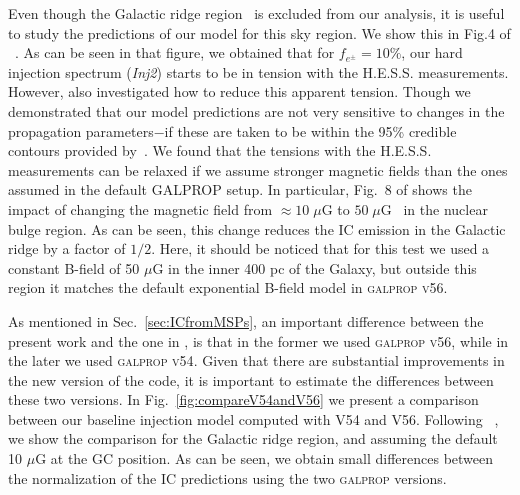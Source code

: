 \documentclass[doublespace,nopageskip]{VTthesis} %
\begin{document}
Even though the Galactic ridge region~\citep{2006Natur.439..695A} is excluded from our analysis, it is useful to study the predictions of our model for this sky region. We show this in Fig.4 of ~\citep{2019PhRvD..99l3020S}. As can be seen in that figure,
we obtained that for $f_{e^\pm} = 10\%$, our hard injection spectrum (\textit{Inj2}) starts to be in tension with the H.E.S.S. measurements. However, \citet{2019PhRvD..99l3020S} also investigated how to reduce this apparent tension. Though we demonstrated that our model predictions are not very sensitive to changes in the propagation parameters$-$if these are taken to be within the 95\% credible contours provided by~\citet{2016ApJ...824...16J}. We found that the tensions with the H.E.S.S. measurements can be relaxed if we assume stronger magnetic fields than the ones assumed in the default GALPROP setup. In particular, Fig.~8 of \citet{2019PhRvD..99l3020S} shows the impact of changing the magnetic field from  $\approx 10\; \mu$G to $50\;\mu$G~\citep{2010Natur.463...65C} in the nuclear bulge region. As can be seen, this change reduces the IC emission in the Galactic ridge by a factor of $1/2$.  Here, it should be noticed that for this test we used a constant B-field of 50 $\mu$G in the inner 400 pc of the Galaxy, but outside this region it matches the default exponential B-field model in \textsc{galprop v56}.  

As mentioned in Sec.~\ref{sec:ICfromMSPs}, an important difference between the present work and the one in \citep{2019PhRvD..99l3020S}, is that in the former we used \textsc{galprop v56}, while in the later we used \textsc{galprop v54}. Given that there are substantial improvements in the new version of the code, it is important to estimate the differences between these two versions. In Fig.~\ref{fig:compareV54andV56} we present a comparison between our baseline injection model computed with V54 and V56. Following ~\citep{2019PhRvD..99l3020S}, we show the comparison for the Galactic ridge region, and assuming the default 10 $\mu$G at the GC position. As can be seen, we obtain small differences between the normalization of the IC predictions using the two \textsc{galprop} versions.
\end{document}
